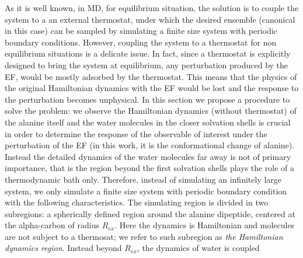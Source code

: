 \documentclass[a4paper,preprint,unsortedaddress,onecolumn]{revtex4-1}
\begin{document}
As it is well known, in MD, for equilibrium situation, the solution is to couple
the system to a an external thermostat, under which the desired ensemble
(canonical in this case) can be
sampled by simulating a finite size system with periodic boundary
conditions.
However, coupling the system to a thermostat for non equilibrium situations is a delicate issue.
In fact, since a thermostat is explicitly designed to bring the system at equilibrium, any perturbation produced by the EF, would be mostly adsorbed by the thermostat. This means that the physics of the original Hamiltonian dynamics with the EF would be lost and the response to the perturbation becomes unphysical. 
In this section we propose a procedure to solve the problem: we
observe the Hamiltonian dynamics (without thermostat) of the alanine 
itself and the water molecules in the closer solvation shells is
crucial in order to determine the response of the observable of interest
under the perturbation of the EF (in this work, it is the conformational change of alanine).
Instead the detailed dynamics of
the water molecules far away is not of primary importance, that is the region beyond the first solvation shells plays the role of a thermodynamic bath only. 
Therefore, instead of simulating an infinitely
large system, we only simulate a finite size system with periodic
boundary condition with the following characteristics. The simulating region is divided in two
subregions: a spherically defined region around the alanine dipeptide, centered at the
alpha-carbon of radius $R_{ex}$. Here the dynamics is
Hamiltonian and molecules are not subject to a thermosat; we refer to such subregion as \emph{the Hamiltonian dynamics
region}. Instead beyond $R_{ex}$, the dynamics of water is coupled
\end{document}
